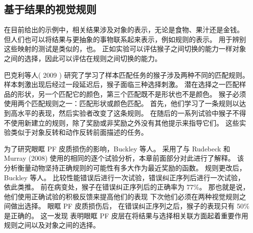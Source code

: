 \subsection{基于结果的视觉规则}
在目前给出的示例中，相关结果涉及对象的表示，无论是食物、果汁还是金钱。 但人们也可以将结果与更抽象的事物联系起来表示，例如规则的表示。 用于辨别这些映射的测试是类似的，也。 正如实验可以评估猴子之间切换的能力一样对象之间的选择，因此可以评估在规则之间切换的能力。\par
巴克利等人( 2009 ) 研究了学习了样本匹配任务的猴子涉及两种不同的匹配规则。 样本刺激出现后经过一段延迟后，猴子面临三种选择刺激。 潜在选择之一匹配样品的形状，另一个匹配它的颜色，第三个匹配既不是形状也不是颜色。 猴子必须使用两个匹配规则之一：匹配形状或颜色匹配。 首先，他们学习了一条规则以达到高水平的表现，然后实验者改变了这条规则。 在随后的一系列试验中猴子不得不使用新建立的规则，除了奖励或非奖励之外没有其他提示来指导它们。 这些实验类似于对象反转和动作反转前面描述的任务。\par
为了研究眼眶 PF 皮质损伤的影响，Buckley 等人。 采用了与 Rudebeck 和 Murray (2008) 使用的相同的逐个试验分析，本章前面部分对此进行了解释。 该分析衡量动物坚持正确规则的可能性有多大作为最近奖励的函数。 规则更改后，Buckley 等人。 比较性能错误后进行一次试验，错误纠正序列后进行一次试验，依此类推。 前在病变处，猴子在错误纠正序列后的正确率为 77\%。 那也就是说，他们使用正确试验的积极反馈来提高他们的表现
下次他们必须在两种视觉规则之间做出选择。 眼眶 PF 皮质损伤后，
在错误纠正序列之后，猴子的表现只有 50\% 是正确的。 这一发现
表明眼眶 PF 皮层在将结果与选择相关联方面起着重要作用
规则之间以及对象之间的选择。\par

